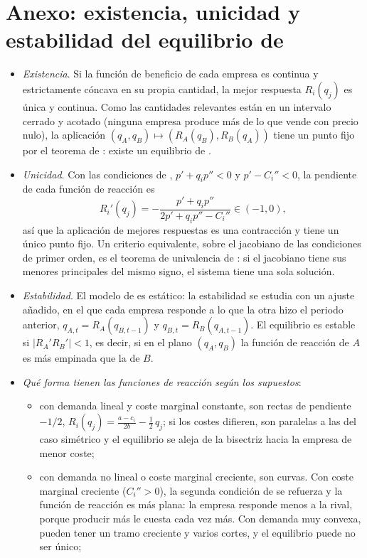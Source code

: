 \documentclass[11pt]{article}
\begin{document}
\section{Anexo: existencia, unicidad y estabilidad\cortetitulo{} del equilibrio de }\label{anexo:cournot}

\begin{itemize}
\item \emph{Existencia}. Si la función de beneficio de cada empresa es continua y estrictamente cóncava en su propia cantidad, la mejor respuesta $R_i(q_j)$ es única y continua. Como las cantidades relevantes están en un intervalo cerrado y acotado (ninguna empresa produce más de lo que vende con precio nulo), la aplicación $(q_A,q_B)\mapsto(R_A(q_B),R_B(q_A))$ tiene un punto fijo por el teorema de : existe un equilibrio de  .
\item \emph{Unicidad}. Con las condiciones de , $p'+q_ip''<0$ y $p'-C_i''<0$, la pendiente de cada función de reacción es
  $$R_i'(q_j)=-\frac{p'+q_ip''}{2p'+q_ip''-C_i''}\in(-1,0),$$
  así que la aplicación de mejores respuestas es una contracción y tiene un único punto fijo. Un criterio equivalente, sobre el jacobiano de las condiciones de primer orden, es el teorema de univalencia de \textcite{GaleNikaido1965Jacobian}: si el jacobiano tiene sus menores principales del mismo signo, el sistema tiene una sola solución.
\item \emph{Estabilidad}. El modelo de  es estático: la estabilidad se estudia con un ajuste añadido, en el que cada empresa responde a lo que la otra hizo el periodo anterior, $q_{A,t}=R_A(q_{B,t-1})$ y $q_{B,t}=R_B(q_{A,t-1})$. El equilibrio es estable si $\lvert R_A'R_B'\rvert<1$, es decir, si en el plano $(q_A,q_B)$ la función de reacción de $A$ es más empinada que la de $B$\nocite{Hahn1962Stability}.\findemo
\item \emph{Qué forma tienen las funciones de reacción según los supuestos}:
  \begin{itemize}
  \item con demanda lineal y coste marginal constante, son rectas de pendiente $-1/2$, $R_i(q_j)=\frac{a-c_i}{2b}-\frac{1}{2}\,q_j$; si los costes difieren, son paralelas a las del caso simétrico y el equilibrio se aleja de la bisectriz hacia la empresa de menor coste;
  \item con demanda no lineal o coste marginal creciente, son curvas. Con coste marginal creciente ($C_i''>0$), la segunda condición de  se refuerza y la función de reacción es más plana: la empresa responde menos a la rival, porque producir más le cuesta cada vez más. Con demanda muy convexa, pueden tener un tramo creciente y varios cortes, y el equilibrio puede no ser único;

\end{itemize}
\end{itemize}
\end{document}
